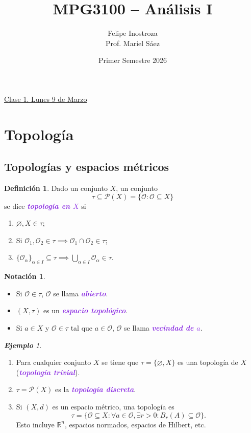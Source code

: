 \documentclass{article}
\title{MPG3100 -- Análisis I}
\author{Felipe Inostroza \\ Prof. Mariel Sáez}
\date{Primer Semestre 2026}
\theoremstyle{definition}
\newtheorem{definition}[theorem]{Definición}
\newtheorem*{notation}{Notación}
\theoremstyle{remark}
\newtheorem{example}[theorem]{\textbf{Ejemplo}}
\numberwithin{equation}{section}
\renewcommand{\O}{\mathcal{O}}
\renewcommand{\P}{\mathcal{P}}
\newcommand{\R}{\mathbb{R}}
\renewcommand{\a}{\alpha}
\renewcommand{\t}{\tau}
\newcommand{\wea}[1]{\textcolor{BlueViolet}{\textbf{\emph{#1}}}}
\newcommand{\fecha}[1]{\begin{flushright} \underline{#1} \end{flushright}}
\begin{document}
\maketitle
\tableofcontents

\newpage
\fecha{Clase 1. Lunes 9 de Marzo}
\section{Topología}
\subsection{Topologías y espacios métricos}

\begin{definition}
  Dado un conjunto $X$, un conjunto
  \[\tau \subseteq \P(X) = \{\O \colon \O \subseteq X\}\]
  se dice \wea{topología en $X$} si
  \begin{enumerate}[(1)]
    \item $\varnothing, X \in \tau$;
    \item Si $\O_1, \O_2 \in \tau \implies \O_1 \cap \O_2 \in \tau$;
    \item $\{\O_\a\}_{\a\in I} \subseteq \tau \implies \bigcup_{\a \in I} \O_\a \in \tau$.
  \end{enumerate}
\end{definition}

\begin{notation}\
  \begin{itemize}
    \item Si $\O \in \t$, $\O$ se llama \wea{abierto}.
    \item $(X,\tau)$ es un \wea{espacio topológico}.
    \item Si $a \in X$ y $\O \in \t$ tal que $a \in \O$, $\O$ se llama \wea{vecindad de $a$}.
  \end{itemize}
\end{notation}

\begin{example}\
  \begin{enumerate}[(1)]
    \item Para cualquier conjunto $X$ se tiene que $\t = \{\varnothing,X\}$ es una topología de $X$ (\wea{topología trivial}).
    \item $\t = \P(X)$ es la \wea{topología discreta}.
    \item Si $(X,d)$ es un espacio métrico, una topología es
    \[\t = \{\O \subseteq X \colon \forall a \in \O, \exists r > 0 \colon B_r(A) \subseteq \O\}.\]
    Esto incluye $\R^n$, espacios normados, espacios de Hilbert, etc.
  \end{enumerate}
\end{example}
\end{document}
